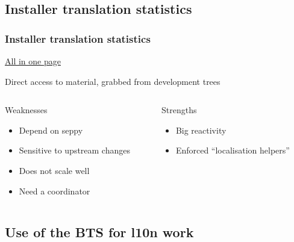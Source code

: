 \documentclass{beamer}
\begin{document}
\subsection{Installer translation statistics}

\begin{frame}
  \frametitle{Installer translation statistics}
	\begin{block}
		{\href{http://people.debian.org/~seppy/d-i/translation-status.html}{All in one page}}
	\end{block}
	\begin{block}
		{Direct access to material, grabbed from development trees}
	\end{block}
  \begin{columns}
    \begin{column}{4.5cm}
	\begin{block}
		{Weaknesses}
		\begin{itemize}
		\item
			Depend on seppy
		\item
			Sensitive to upstream changes
		\item
			Does not scale well
		\item
			Need a coordinator
		\end{itemize}
	\end{block}
    \end{column}
    \begin{column}{4.5cm}
	\begin{block}
		{Strengths}
		\begin{itemize}
		\item
			Big reactivity
		\item
			Enforced ``localisation helpers''
		\end{itemize}
	\end{block}
    \end{column}
  \end{columns}
\end{frame}

\subsection{Use of the BTS for l10n work}
\end{document}
